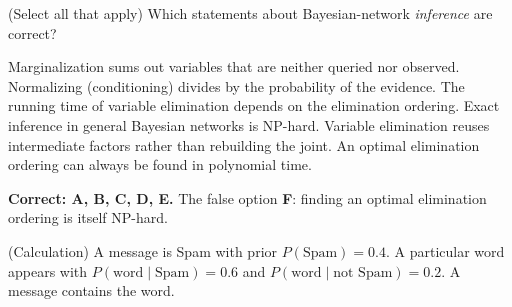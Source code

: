 \documentclass[answers,addpoints]{exam}
\begin{document}
\begin{questions}
\question[3] (Select all that apply) Which statements about Bayesian-network
\emph{inference} are correct?
\begin{checkboxes}
  \CorrectChoice Marginalization sums out variables that are neither queried nor
        observed.
  \CorrectChoice Normalizing (conditioning) divides by the probability of the
        evidence.
  \CorrectChoice The running time of variable elimination depends on the
        elimination ordering.
  \CorrectChoice Exact inference in general Bayesian networks is NP-hard.
  \CorrectChoice Variable elimination reuses intermediate factors rather than
        rebuilding the joint.
  \choice An optimal elimination ordering can always be found in polynomial time.
\end{checkboxes}
\begin{solution}
\textbf{Correct: A, B, C, D, E.} The false option \textbf{F}: finding an optimal
elimination ordering is itself NP-hard.
\end{solution}

\question[5] (Calculation) A message is Spam with prior $P(\text{Spam})=0.4$. A
particular word appears with $P(\text{word}\mid\text{Spam})=0.6$ and
$P(\text{word}\mid\text{not Spam})=0.2$. A message contains the word.


\end{questions}
\end{document}
